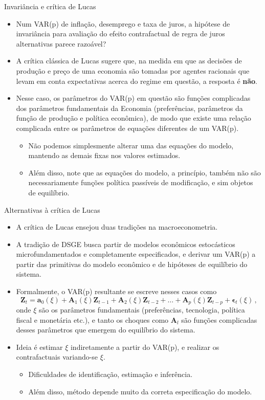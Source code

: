 \documentclass[11pt]{beamer}
\begin{document}
\begin{frame}{Invariância e crítica de Lucas}
	\begin{itemize}
		\item Num VAR(p) de inflação, desemprego e taxa de juros, a hipótese de invariância para  avaliação do efeito contrafactual de regra de juros alternativas parece razoável?
		\item A {\color{blue}crítica clássica de Lucas} sugere que, na medida em que as decisões de produção e preço de uma economia são tomadas por agentes racionais que levam em conta expectativas acerca do regime em questão, a resposta é \textbf{não}.
		\item Nesse caso, os parâmetros do VAR(p) em questão são funções complicadas dos parâmetros fundamentais da Economia (preferências, parâmetros da função de produção e política econômica), de modo que existe uma relação complicada entre os parâmetros de equações diferentes de um VAR(p).
		\begin{itemize}
			\item Não podemos simplesmente alterar uma das equações do modelo, mantendo as demais fixas nos valores estimados.
			\item Além disso, note que as equações do modelo, a princípio, também não são necessariamente funções política passíveis de modificação, e sim objetos de equilíbrio.
		\end{itemize}
		\end{itemize}
\end{frame}
\begin{frame}{Alternativas à crítica de Lucas}
\begin{itemize}
	\item A crítica de Lucas ensejou duas tradições na macroeconometria.
	\item A tradição de DSGE busca partir de modelos econômicos estocásticos microfundamentados e completamente especificados, e derivar um VAR(p) a partir das primitivas  do modelo econômico e de hipóteses de equilíbrio do sistema.
		\item Formalmente, o VAR(p) resultante se escreve nesses casos como 
	\begin{equation*}
		\boldsymbol{Z}_t = \boldsymbol{a}_0(\xi)+ \boldsymbol{A}_1(\xi) \boldsymbol{Z}_{t-1} + \boldsymbol{A}_2(\xi) \boldsymbol{Z}_{t-2} + \ldots + \boldsymbol{A}_p(\xi) \boldsymbol{Z}_{t-p} + \boldsymbol{\epsilon}_t(\xi) \, ,
	\end{equation*}
	onde $\xi$ são os parâmetros fundamentais (preferências, tecnologia, política fiscal e monetária etc.), e tanto os  choques como $\boldsymbol{A}_l$ são funções complicadas desses parâmetros que emergem do equilíbrio do sistema.
	\item Ideia é estimar $\xi$ indiretamente a partir do VAR(p), e realizar os contrafactuais variando-se $\xi$.
	\begin{itemize}
		\item Dificuldades de identificação, estimação e inferência. 
		\item Além disso, método depende muito da correta especificação do modelo.
	\end{itemize}
	
\end{itemize}
\end{frame}
\end{document}
